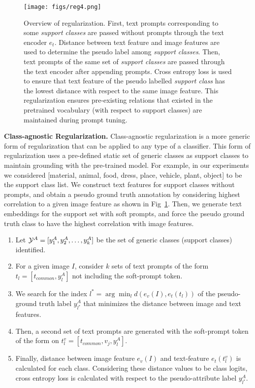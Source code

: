 \documentclass[10pt,twocolumn,letterpaper]{article}
\begin{document}
\begin{figure}[h] 
\centering
\texttt{[image: figs/reg4.png]} 
\caption{Overview of regularization. First, text prompts corresponding to some \textit{support classes} are passed  without prompts through the text encoder $e_t$. Distance between text feature and image features are used to determine the pseudo label among \textit{support classes}. Then,  text prompts of the same set of \textit{support classes} are passed through the text encoder after appending prompts. Cross entropy loss is used to ensure that text feature of the pseudo labelled \textit{support class}  has the lowest distance with respect to the same image feature. This regularization ensures pre-existing relations that existed in the pretrained vocabulary (with respect to {support classes}) are maintained during prompt tuning. }
\label{fig:reg}
\end{figure}

\vspace{0.5em}

\noindent \textbf{Class-agnostic Regularization.} Class-agnostic regularization is a more generic form of regularization that can be applied to any type of a classifier. This form of regularization uses a pre-defined static set of generic classes as support classes to maintain grounding with the pre-trained model. For example, in our experiments we considered [material, animal, food, dress, place, vehicle, plant, object] to be the support class list. We construct text features for support classes without prompts, and obtain a pseudo ground truth annotation by considering highest correlation to a given image feature as shown in Fig~\ref{fig:reg}. Then, we generate text embeddings for the support set with soft prompts, and force the pseudo ground truth class to have the highest correlation with image features.

\begin{enumerate}
\itemsep-0.2em 
    \item Let $\mathcal{Y}^A = [ y^A_1, y^A_2, \dots , y^A_k]$ be the set of generic classes (support classes) identified. 
    \item For a given image $I$, consider $k$ sets of text prompts of the form $t_l = [ t_{common}, y^A_l ]$ not including the soft-prompt token.
    \item 
    We search for the index $l^* = \arg \min_l d(e_v(I), e_t(t_l))$ of the pseudo-ground truth label $y^A_{l^*}$ that minimizes the distance between image and text features.
    \item Then, a second set of text prompts are generated with the soft-prompt token of the form on $t_l^v = [ t_{common},  v_j , y_l^A]$.
    \item Finally, distance between image feature $e_v(I)$ and text-feature $e_t(t^v_l)$ is calculated for each class. Considering these distance values to be class logits, cross entropy loss is calculated with respect to the pseudo-attribute label $y^A_{l^*}$.
\end{enumerate}
\end{document}

